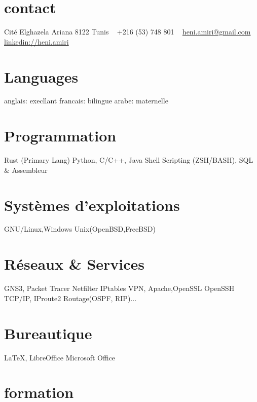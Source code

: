 \documentclass[]{friggeri-cv}
\begin{document}


\begin{aside} %
\section{contact}
Cité Elghazela
Ariana 8122
Tunis
~
+216 (53) 748 801
~
\href{mailto:heni.amiri@gmail.com}{heni.amiri@gmail.com}
\href{http://tn.linkedin.com/in/heniamiri}{linkedin://heni.amiri}
\section{Languages}
anglais: execllant
francais: bilingue
arabe: maternelle
\section{Programmation}
Rust (Primary Lang)
Python, C/C++, Java
Shell Scripting (ZSH/BASH), SQL \& Assembleur
\section{Systèmes d'exploitations}
GNU/Linux,Windows
Unix(OpenBSD,FreeBSD)
\section{Réseaux \& Services}
GNS3, Packet Tracer
Netfilter IPtables
VPN, Apache,OpenSSL OpenSSH
TCP/IP, IProute2
Routage(OSPF, RIP)...
\section{Bureautique}
\LaTeX, LibreOffice
Microsoft Office
\end{aside}


\section{formation}
\end{document}
